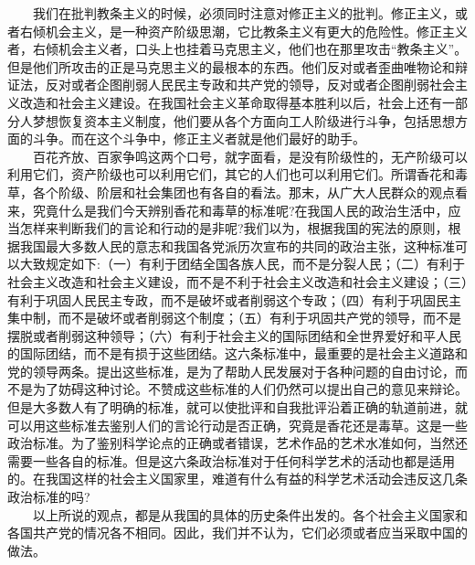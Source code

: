 \documentclass[cn,11pt,chinese]{elegantbook}
\begin{document}
　　我们在批判教条主义的时候，必须同时注意对修正主义的批判。修正主义，或者右倾机会主义，是一种资产阶级思潮，它比教条主义有更大的危险性。修正主义者，右倾机会主义者，口头上也挂着马克思主义，他们也在那里攻击“教条主义”。但是他们所攻击的正是马克思主义的最根本的东西。他们反对或者歪曲唯物论和辩证法，反对或者企图削弱人民民主专政和共产党的领导，反对或者企图削弱社会主义改造和社会主义建设。在我国社会主义革命取得基本胜利以后，社会上还有一部分人梦想恢复资本主义制度，他们要从各个方面向工人阶级进行斗争，包括思想方面的斗争。而在这个斗争中，修正主义者就是他们最好的助手。\\
　　百花齐放、百家争鸣这两个口号，就字面看，是没有阶级性的，无产阶级可以利用它们，资产阶级也可以利用它们，其它的人们也可以利用它们。所谓香花和毒草，各个阶级、阶层和社会集团也有各自的看法。那末，从广大人民群众的观点看来，究竟什么是我们今天辨别香花和毒草的标准呢?在我国人民的政治生活中，应当怎样来判断我们的言论和行动的是非呢?我们以为，根据我国的宪法的原则，根据我国最大多数人民的意志和我国各党派历次宣布的共同的政治主张，这种标准可以大致规定如下:（一）有利于团结全国各族人民，而不是分裂人民；（二）有利于社会主义改造和社会主义建设，而不是不利于社会主义改造和社会主义建设；（三）有利于巩固人民民主专政，而不是破坏或者削弱这个专政；（四）有利于巩固民主集中制，而不是破坏或者削弱这个制度；（五）有利于巩固共产党的领导，而不是摆脱或者削弱这种领导；（六）有利于社会主义的国际团结和全世界爱好和平人民的国际团结，而不是有损于这些团结。这六条标准中，最重要的是社会主义道路和党的领导两条。提出这些标准，是为了帮助人民发展对于各种问题的自由讨论，而不是为了妨碍这种讨论。不赞成这些标准的人们仍然可以提出自己的意见来辩论。但是大多数人有了明确的标准，就可以使批评和自我批评沿着正确的轨道前进，就可以用这些标准去鉴别人们的言论行动是否正确，究竟是香花还是毒草。这是一些政治标准。为了鉴别科学论点的正确或者错误，艺术作品的艺术水准如何，当然还需要一些各自的标准。但是这六条政治标准对于任何科学艺术的活动也都是适用的。在我国这样的社会主义国家里，难道有什么有益的科学艺术活动会违反这几条政治标准的吗?\\
　　以上所说的观点，都是从我国的具体的历史条件出发的。各个社会主义国家和各国共产党的情况各不相同。因此，我们并不认为，它们必须或者应当采取中国的做法。\\
\end{document}
